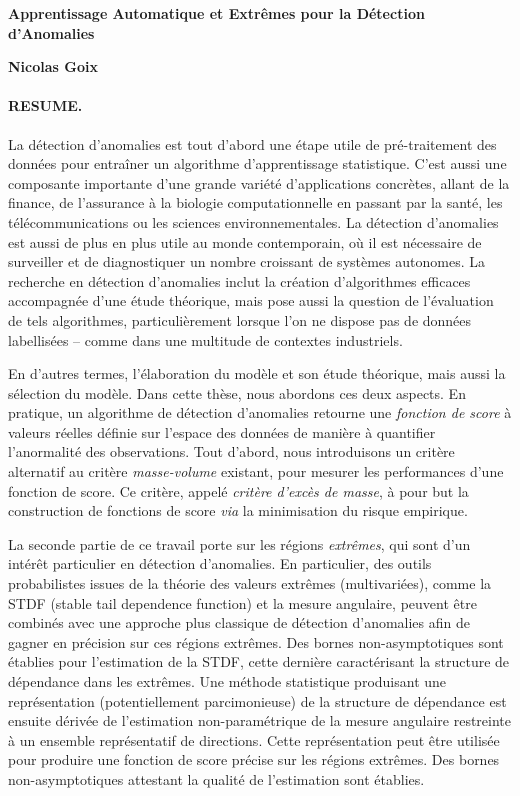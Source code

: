 \documentclass[a4paper, 8pt]{article}
\begin{document}
\begin{center}
{\large \textbf{Apprentissage Automatique et Extrêmes pour la Détection d'Anomalies\\}}
\vspace{0.5em}

\textbf{Nicolas Goix}
\end{center}



\paragraph{RESUME.}

La détection d'anomalies est tout d'abord une étape utile de pré-traitement des données pour entraîner un algorithme d'apprentissage statistique. C'est aussi une composante importante d'une grande variété d'applications concrètes, allant de la finance, de l'assurance à la biologie computationnelle en passant par la santé, les télécommunications ou les sciences environnementales. La détection d'anomalies est aussi de plus en plus utile au monde contemporain, où il est nécessaire de surveiller et de diagnostiquer un nombre croissant de systèmes autonomes. La recherche en détection d'anomalies inclut la création d'algorithmes efficaces accompagnée d'une étude théorique, mais pose aussi la question de l'évaluation de tels algorithmes, particulièrement lorsque l'on ne dispose pas de données labellisées -- comme dans une multitude de contextes industriels.

En d'autres termes, l'élaboration du modèle et son étude théorique, mais aussi la sélection du modèle. Dans cette thèse, nous abordons ces deux aspects. En pratique, un algorithme de détection d'anomalies retourne une \emph{fonction de score} à valeurs réelles définie sur l'espace des données de manière à quantifier l'anormalité des observations. Tout d'abord, nous introduisons un critère alternatif au critère \emph{masse-volume} existant, pour mesurer les performances d'une fonction de score. Ce critère, appelé \emph{critère d'excès de masse}, à pour but la construction de fonctions de score \emph{via} la minimisation du risque empirique.


La seconde partie de ce travail porte sur les régions \emph{extrêmes}, qui sont d'un intérêt particulier en détection d'anomalies. En particulier, des outils probabilistes issues de la théorie des valeurs extrêmes (multivariées), comme la STDF (stable tail dependence function) et la mesure angulaire, peuvent être combinés avec une approche plus classique de détection d'anomalies afin de gagner en précision sur ces régions extrêmes. Des bornes non-asymptotiques sont établies pour l'estimation de la STDF, cette dernière caractérisant la structure de dépendance dans les extrêmes. Une méthode statistique produisant une représentation (potentiellement parcimonieuse) de la structure de dépendance est ensuite dérivée de l'estimation non-paramétrique de la mesure angulaire restreinte à un ensemble représentatif de directions. Cette représentation peut être utilisée pour produire une fonction de score précise sur les régions extrêmes. Des bornes non-asymptotiques attestant la qualité de l'estimation sont établies.
\end{document}
